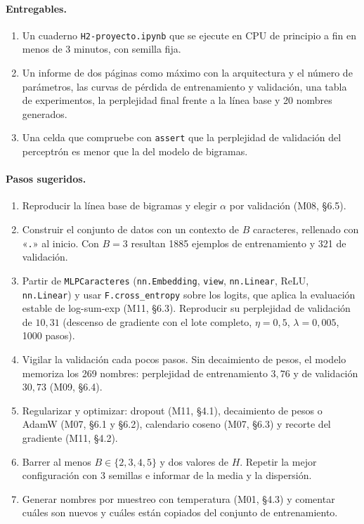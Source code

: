\paragraph{Entregables.}
\begin{enumerate}[label=\arabic*.]
  \item Un cuaderno \texttt{H2-proyecto.ipynb} que se ejecute en CPU de principio a fin en menos de 3 minutos, con semilla fija.
  \item Un informe de dos páginas como máximo con la arquitectura y el número de parámetros, las curvas de pérdida de entrenamiento y validación, una tabla de experimentos, la perplejidad final frente a la línea base y 20 nombres generados.
  \item Una celda que compruebe con \texttt{assert} que la perplejidad de validación del perceptrón es menor que la del modelo de bigramas.
\end{enumerate}

\paragraph{Pasos sugeridos.}
\begin{enumerate}[label=\arabic*.]
  \item Reproducir la línea base de bigramas y elegir $\alpha$ por validación (M08, §6.5).
  \item Construir el conjunto de datos con un contexto de $B$ caracteres, rellenado con «\texttt{.}» al inicio. Con $B=3$ resultan 1885 ejemplos de entrenamiento y 321 de validación.
  \item Partir de \texttt{MLPCaracteres} (\texttt{nn.Embedding}, \texttt{view}, \texttt{nn.Linear}, ReLU, \texttt{nn.Linear}) y usar \texttt{F.cross\_entropy} sobre los logits, que aplica la evaluación estable de log-sum-exp (M11, §6.3). Reproducir su perplejidad de validación de $10{,}31$ (descenso de gradiente con el lote completo, $\eta=0{,}5$, $\lambda=0{,}005$, 1000 pasos).
  \item Vigilar la validación cada pocos pasos. Sin decaimiento de pesos, el modelo memoriza los 269 nombres: perplejidad de entrenamiento $3{,}76$ y de validación $30{,}73$ (M09, §6.4).
  \item Regularizar y optimizar: dropout (M11, §4.1), decaimiento de pesos o AdamW (M07, §6.1 y §6.2), calendario coseno (M07, §6.3) y recorte del gradiente (M11, §4.2).
  \item Barrer al menos $B\in\{2,3,4,5\}$ y dos valores de $H$. Repetir la mejor configuración con 3 semillas e informar de la media y la dispersión.
  \item Generar nombres por muestreo con temperatura (M01, §4.3) y comentar cuáles son nuevos y cuáles están copiados del conjunto de entrenamiento.
\end{enumerate}

